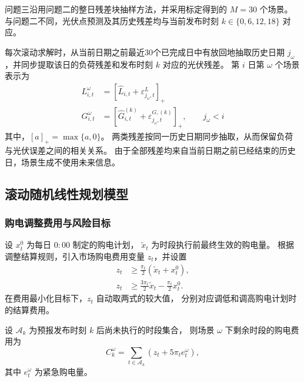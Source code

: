 问题三沿用问题二的整日残差块抽样方法，并采用标定得到的
\(M=30\) 个场景。
与问题二不同，光伏点预测及其历史残差均与当前发布时刻
\(k\in\{0,6,12,18\}\) 对应。

每次滚动求解时，从当前日期之前最近30个已完成日中有放回地抽取历史日期 \(j_{\omega}\)，并同步提取该日的负荷残差和发布时刻 \(k\) 对应的光伏残差。
第 \(i\) 日第 \(\omega\) 个场景表示为
\begin{equation}
\begin{aligned}
L_{i,t}^{\omega}
&=
\left[
\widehat L_{i,t}
+
\varepsilon_{j_{\omega},t}^{L}
\right]_{+} \\
G_{i,t}^{\omega}
&=
\left[
\widehat G_{i,t}^{(k)}
+
\varepsilon_{j_{\omega},t}^{G,(k)}
\right]_{+},
\qquad
j_{\omega}<i
\end{aligned}
\label{eq:q3_scenario}
\end{equation}
其中，\([a]_{+}=\max\{a,0\}\)。
两类残差按同一历史日期同步抽取，从而保留负荷与光伏误差之间的相关关系。
由于全部残差均来自当前日期之前已经结束的历史日，场景生成不使用未来信息。


\subsection{滚动随机线性规划模型}

\subsubsection{购电调整费用与风险目标}

设 $x_t^0$ 为每日 $0{:}00$ 制定的购电计划，
$\widetilde{x}_t$ 为时段执行前最终生效的购电量。
根据调整结算规则，引入市场购电费用变量 $z_t$，并设置
\begin{equation}
\begin{aligned}
z_t&\geq
\frac{\pi_t}{2}\left(\widetilde{x}_t+x_t^0\right),\\
z_t&\geq
\frac{3\pi_t}{2}\widetilde{x}_t-\frac{\pi_t}{2}x_t^0.
\end{aligned}
\label{eq:q3_settlement_linear}
\end{equation}
在费用最小化目标下，$z_t$ 自动取两式的较大值，
分别对应调低和调高购电计划时的结算费用。

设 $\mathcal A_k$ 为预报发布时刻 $k$ 后尚未执行的时段集合，
则场景 $\omega$ 下剩余时段的购电费用为
\begin{equation}
C_k^\omega
=
\sum_{t\in\mathcal A_k}
\left(z_t+5\pi_t e_t^\omega\right),
\label{eq:q3_cost}
\end{equation}
其中 $e_t^\omega$ 为紧急购电量。

